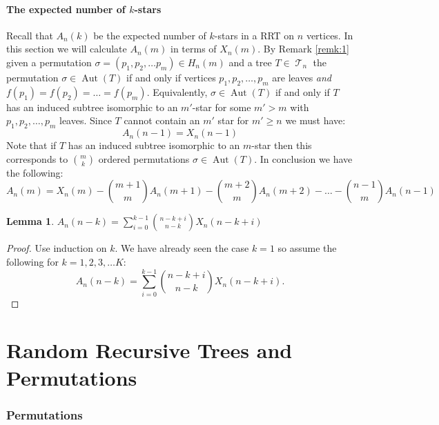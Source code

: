 \documentclass[oneside]{book} %
\newtheorem{lem}[thm]{Lemma}
\theoremstyle{definition}
\numberwithin{equation}{section}
\DeclareMathOperator{\Aut}{Aut} %
\DeclareMathOperator{\T}{\mathcal{T}}
\begin{document}
\subsubsection{The expected number of $k$-stars}
Recall that $A_n(k)$ be the expected number of $k$-stars in a RRT on $n$ vertices. In this section we will calculate $A_n(m)$  in terms of $X_n(m)$.  By Remark \ref{remk:1} given a permutation $\sigma  = (p_1,p_2,\dots p_m) \in H_n(m)$ and a tree $T \in \T_n$ the permutation $\sigma \in \Aut(T)$ if and only if vertices $p_1,p_2,\dots,p_m$ are leaves \emph {and} $f(p_1) = f(p_2) = \dots = f(p_m)$.  Equivalently,  $\sigma \in \Aut(T)$ if and only if $T$ has an induced subtree isomorphic to an $m'$-star for some $m'>m$ with $p_1,p_2,\dots,p_m$ leaves.  Since $T$ cannot contain an $m'$ star for $m' \geq n$ we must have:
\[
 A_n(n-1) = X_n(n-1)
\]
Note that if $T$ has an induced subtree isomorphic to an $m$-star then this corresponds to ${m\choose k}$ ordered permutations $\sigma \in \Aut(T)$.  In conclusion we have the following:
\begin{equation}
 A_n(m) = X_n(m) - {m+1\choose m}A_n(m+1) - {m+2\choose m}A_n(m+2) - \dots - {n-1\choose m} A_n(n-1)
\end{equation}



\begin{lem}
 $A_n(n-k) = \sum_{i=0}^{k-1}{n-k+i\choose n-k} X_n(n-k+i)$
\end{lem}
\begin{proof}
Use induction on $k$.  We have already seen the case $k = 1$ so assume the following for $k = 1,2,3,\dots K$:
\begin{equation}\label{eqn:indhyp}
  A_n(n-k) = \sum_{i=0}^{k-1}{n-k+i\choose n-k} X_n(n-k+i).
\end{equation}

\end{proof}








\chapter{Random Recursive Trees and Permutations}

\subsection{Permutations}
\end{document}
